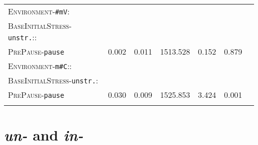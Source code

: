 \begin{table}[H]
{\begin{tabular}{lSSSSSS}
		\textsc{Environment}-\texttt{\#mV}:&&&&&\\
		\textsc{BaseInitialStress}-\texttt{unstr.}::&&&&&\\
		\textsc{PrePause}-\texttt{pause} & \color{lsGuidelinesGray}0.002 & \color{lsGuidelinesGray}0.011 & \color{lsGuidelinesGray}1513.528 & \color{lsGuidelinesGray}0.152 &\color{lsGuidelinesGray}0.879 \\ 
		\textsc{Environment}-\texttt{m\#C}::&&&&&\\
		\textsc{BaseInitialStress}-\texttt{unstr.}:&&&&&\\
		\textsc{PrePause}-\texttt{pause }& 0.030 & 0.009 & 1525.853 & 3.424 & 0.001 \\ 
		\lspbottomrule 
			\end{tabular}}
\end{table}
\clearpage

\section{\textit{un-} and \textit{in-}}


